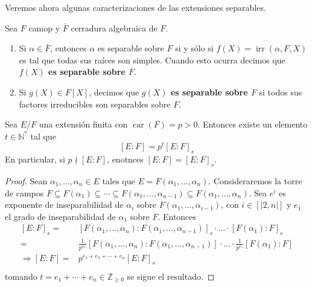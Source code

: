 \documentclass[12pt]{report}
\theoremstyle{largebreak}
\newcommand\natint[1]{\ensuremath{\left[\big|#1\big|\right]}}
\DeclareMathOperator{\car}{car}
\DeclareMathOperator{\irr}{irr}
\begin{document}
    Veremos ahora algunas caracterizaciones de las extensiones separables.

    \begin{obs}
        Sea $F$ camop y $\bar{F}$ cerradura algebraica de $F$.
        \begin{enumerate}
            \item Si $\alpha\in\bar{F}$, entonces $\alpha$ es separable sobre $F$ si y sólo si $f(X)=\irr(\alpha, F, X)$ es tal que todas sus raíces son simples. Cuando esto ocurra decimos que \textbf{$f(X)$ es separable sobre $F$}.
            \item Si $g(X)\in F[X]$, decimos que \textbf{$g(X)$ es separable sobre $F$} si todos sus factores irreducibles son separables sobre $F$.
        \end{enumerate}
    \end{obs}

    \begin{propo}
        Sea $E/F$ una extensión finita con $\car(F)=p>0$. Entonces existe un elemento $t\in\mathbb{N}^{*}$ tal que
        \begin{equation}
            \left[E:F\right]=p^t\left[E:F\right]_s
        \end{equation}
        En particular, si $p\nmid \left[E:F\right]$, enotnces $\left[E:F\right]=\left[E:F\right]_s$.
    \end{propo}

    \begin{proof}
        Sean $\alpha_1,\dots,\alpha_n\in E$ tales que $E=F(\alpha_1,\dots,\alpha_n)$. Consideraremos la torre de campos $F\subseteq F(\alpha_1)\subseteq\cdots\subseteq F(\alpha_1,\dots,\alpha_{n-1})\subseteq F(\alpha_1,\dots,\alpha_n)$.
        Sea $e^{i}$ es exponente de inseparabilidad de $\alpha_i$ sobre $F(\alpha_1,\dots,\alpha_{i-1})$, con $i\in\natint{2,n}$ y $e_1$ el grado de inseparabilidad de $\alpha_1$ sobre $F$. Entonces
        \begin{equation*}
            \begin{split}
                \left[E:F\right]_s=&\left[F(\alpha_1,\dots,\alpha_n):F(\alpha_1,\dots,\alpha_{n-1})\right]_s\cdot\dots\cdot[F(\alpha_1):F]_s\\
                =&\frac{1}{p^{e_n}} \left[F(\alpha_1,\dots,\alpha_n):F(\alpha_1,\dots,\alpha_{n-1})\right]\cdot\dots\cdot\frac{1}{p^{e_1}}[F(\alpha_1):F]\\
                \Rightarrow [E:F]=&p^{e_1+e_2+\cdots+e_n}\left[E:F\right]_s\\
            \end{split}
        \end{equation*}
        tomando $t=e_1+\cdots+e_n\in\mathbb{Z}_{\geq0}$ se sigue el resultado.
    \end{proof}
\end{document}
